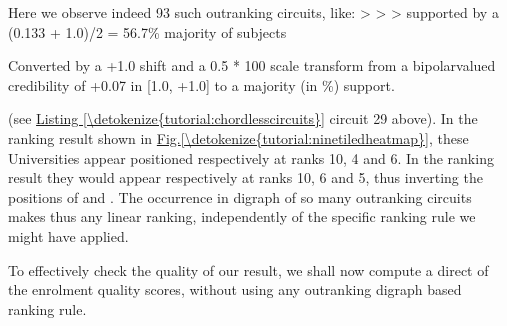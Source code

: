 \documentclass[a4paper,12pt,english]{sphinxhowto}
\begin{document}
Here we observe indeed 93 such outranking circuits, like:  \textgreater{}  \textgreater{}  \textgreater{}  supported by a (0.133 + 1.0)/2 = 56.7\% majority of subjects %
\begin{footnote}[31]\sphinxAtStartFootnote
Converted by a +1.0 shift and a 0.5 * 100 scale transform from a bipolar\sphinxhyphen{}valued credibility of +0.07 in {[}\sphinxhyphen{}1.0, +1.0{]} to a majority (in \%) support.
%
\end{footnote} (see \hyperref[\detokenize{tutorial:chordlesscircuits}]{Listing \ref{\detokenize{tutorial:chordlesscircuits}}} circuit 29 above). In the  ranking result shown in \hyperref[\detokenize{tutorial:ninetiledheatmap}]{Fig.\@ \ref{\detokenize{tutorial:ninetiledheatmap}}}, these Universities appear positioned respectively at ranks 10, 4 and 6. In the  ranking result they would appear respectively at ranks 10, 6 and 5, thus inverting the positions of  and . The occurrence in digraph  of so many outranking circuits makes thus  any  linear ranking, independently of the specific ranking rule we might have applied.

To effectively check the quality of our   result, we shall now compute a direct  of the enrolment quality scores, without using any outranking digraph based ranking rule.
\end{document}
